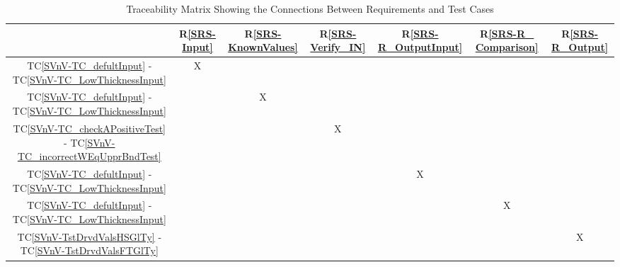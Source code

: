 \documentclass[12pt, titlepage]{article}
\newcommand{\rref}[1]{R\ref{#1}}
\newcommand{\tcref}[1]{TC\ref{#1}}
\begin{document}
\begin{table}[!h]
	\centering
	\begin{tabular}{|c|c|c|c|c|c|c|}
		\hline
		& \rref{SRS-Input}& \rref{SRS-KnownValues}& \rref{SRS-Verify_IN}& \rref{SRS-R_OutputInput}& 
		\rref{SRS-R_ Comparison}& \rref{SRS-R_Output}\\
		\hline
		\tcref{SVnV-TC_defultInput} - \tcref{SVnV-TC_LowThicknessInput}                 
		& X& & & & &  \\ \hline
		\tcref{SVnV-TC_defultInput} - \tcref{SVnV-TC_LowThicknessInput}                 
		& &X & & & &  \\ \hline
		\tcref{SVnV-TC_checkAPositiveTest} - \tcref{SVnV-TC_incorrectWEqUpprBndTest} 
		& & & X& & & \\ \hline
		\tcref{SVnV-TC_defultInput} - \tcref{SVnV-TC_LowThicknessInput}                             
		& & & &X& &   \\ \hline
		\tcref{SVnV-TC_defultInput} - \tcref{SVnV-TC_LowThicknessInput}                              
		& & & & &X &   \\ \hline
		\tcref{SVnV-TstDrvdValsHSGlTy} - \tcref{SVnV-TstDrvdValsFTGlTy}                                                
		& & & & & &X  \\ \hline
		
		\hline
	\end{tabular}
\caption{Traceability Matrix Showing the Connections Between Requirements 
and Test Cases}
\label{Table:TraceTestReq}
\end{table}
\end{document}
